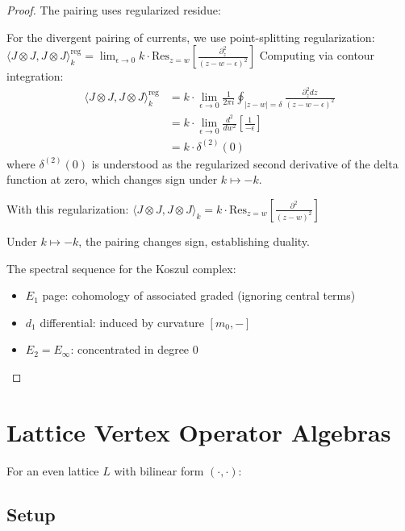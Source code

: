 \begin{proof}
The pairing uses regularized residue:

\begin{definition}\label{def:regularization}
For the divergent pairing of currents, we use point-splitting regularization:
$\langle J \otimes J, J \otimes J \rangle_k^{\text{reg}} = \lim_{\epsilon \to 0} k \cdot \text{Res}_{z=w}\left[\frac{\partial_z^2}{(z-w-\epsilon)^2}\right]$
Computing via contour integration:
\begin{align}
\langle J \otimes J, J \otimes J \rangle_k^{\text{reg}} &= k \cdot \lim_{\epsilon \to 0} \frac{1}{2\pi i} \oint_{|z-w|=\delta} \frac{\partial_z^2 dz}{(z-w-\epsilon)^2}\\
&= k \cdot \lim_{\epsilon \to 0} \frac{d^2}{dw^2}\left[\frac{1}{-\epsilon}\right]\\
&= k \cdot \delta^{(2)}(0)
\end{align}
where $\delta^{(2)}(0)$ is understood as the regularized second derivative of the delta function at zero, which changes sign under $k \mapsto -k$.
\end{definition}

With this regularization:
$\langle J \otimes J, J \otimes J \rangle_k = k \cdot \text{Res}_{z=w}\left[\frac{\partial^2}{(z - w)^2}\right]$

Under $k \mapsto -k$, the pairing changes sign, establishing duality.

The spectral sequence for the Koszul complex:
\begin{itemize}
\item $E_1$ page: cohomology of associated graded (ignoring central terms)
\item $d_1$ differential: induced by curvature $[m_0, -]$
\item $E_2 = E_\infty$: concentrated in degree 0
\end{itemize}
\end{proof}
 
\section{Lattice Vertex Operator Algebras}
 
For an even lattice $L$ with bilinear form $(\cdot, \cdot)$:
 
\subsection{Setup}
 
